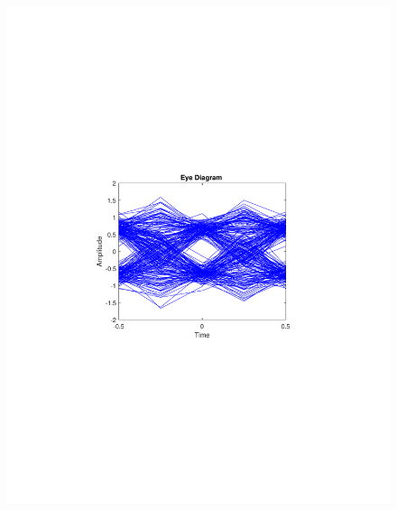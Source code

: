 \begin{refsection}
\begin{figure}[H]
\begin{minipage}{0.30\textwidth}
		\includegraphics[clip, trim=4cm 8cm 4cm 8cm, width=1\textwidth]{./sdf/m_qam_system/figures/expResults/intradyne/6_eye_4GBdInSig13dB_AfMIMO2.pdf}
		\label{fig:4GBdSpecMIMO2}
	\end{minipage}
	\begin{minipage}{0.30\textwidth}
		\centering

\end{minipage}
\end{figure}
\end{refsection}
